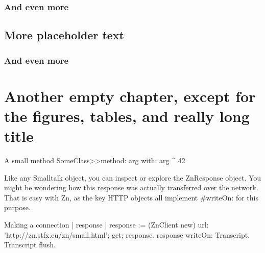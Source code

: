 \documentclass{sbabook}
\begin{document}
\textlatin{\lipsum[3]}


\subsection{And even more}

\textlatin{\lipsum[4]}


\section{More placeholder text}

\textlatin{\lipsum[3]}


\subsection{And even more}

\textlatin{\lipsum[4]}



\chapter{Another empty chapter, except for the figures, tables, and really long title}

\begin{leftbar}
    \lipsum[2]
\end{leftbar}

\begin{script}[fortytwo]{A small method}
SomeClass>>method: arg with: arg
    ^ 42
\end{script}

Like any Smalltalk object, you can inspect or explore the ZnResponse object. You might be wondering how this response was actually transferred over the network. That is easy with Zn, as the key HTTP objects all implement \#writeOn: for this purpose.

\begin{script}{Making a connection}
| response |
response := (ZnClient new)
  url: 'http://zn.stfx.eu/zn/small.html';
  get;
  response.
response writeOn: Transcript.
Transcript flush.
\end{script}
\end{document}
